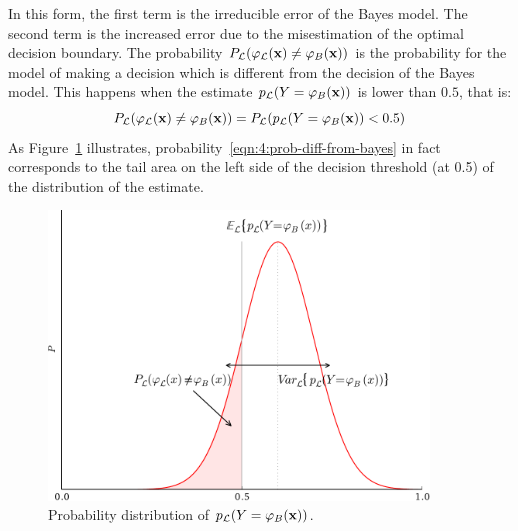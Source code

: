 In this form, the first term is the irreducible error of the Bayes model. The
second term is the increased error due to the misestimation of the optimal
decision boundary. The probability $P_{\cal L}(\varphi_{\cal L}(\mathbf{x})\neq
\varphi_B(\mathbf{x}))$  is the probability for the model of making a decision
which is different from the decision of the Bayes model. This happens
when the estimate $p_{\cal L}(Y=\varphi_B(\mathbf{x}))$ is lower
than $0.5$, that is:
\begin{equation}\label{eqn:4:prob-diff-from-bayes}
P_{\cal L}(\varphi_{\cal L}(\mathbf{x})\neq \varphi_B(\mathbf{x})) = P_{\cal L}(p_{\cal L}(Y=\varphi_B(\mathbf{x})) < 0.5)
\end{equation}
As Figure~\ref{fig:estimate-distribution} illustrates, probability~\ref{eqn:4:prob-diff-from-bayes}
in fact corresponds to the tail area on the left side
of the decision threshold (at 0.5) of the distribution of the estimate.

\begin{figure}
    \centering
    \includegraphics[width=0.9\textwidth]{figures/ch4_estimate_distribution.pdf}
    \caption{Probability distribution of $p_{\cal L}(Y=\varphi_B(\mathbf{x}))$.}
    \label{fig:estimate-distribution}
\end{figure}


